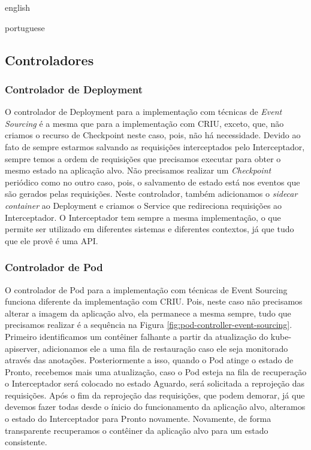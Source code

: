 \begin{otherlanguage*}{english}
\begin{otherlanguage*}{portuguese}
\subsection{Controladores}

\subsubsection{Controlador de Deployment}

O controlador de Deployment para a implementação com técnicas de \textit{Event Sourcing} é
a mesma que para a implementação com CRIU, exceto, que, não criamos o recurso de Checkpoint neste
caso, pois, não há necessidade. Devido ao fato de sempre estarmos salvando as requisições
interceptados pelo Interceptador, sempre temos a ordem de requisições que precisamos
executar para obter o mesmo estado na aplicação alvo. Não precisamos realizar um
\textit{Checkpoint} periódico como no outro caso, pois, o salvamento de estado está nos
eventos que são gerados pelas requisições. Neste controlador, também adicionamos o 
\textit{sidecar container} ao Deployment e criamos o Service que redireciona requisições
ao Interceptador. O Interceptador tem sempre a mesma implementação, o que permite ser
utilizado em diferentes sistemas e diferentes contextos, já que tudo que ele provê é uma
API.

\subsubsection{Controlador de Pod}

O controlador de Pod para a implementação com técnicas de Event Sourcing funciona
diferente da implementação com CRIU. Pois, neste caso não precisamos alterar a imagem da
aplicação alvo, ela permanece a mesma sempre, tudo que precisamos realizar é a sequência
na Figura \ref{fig:pod-controller-event-sourcing}. Primeiro identificamos um contêiner
falhante a partir da atualização do kube-apiserver, adicionamos ele a uma fila de
restauração caso ele seja monitorado através das anotações. Posteriormente a isso, quando
o Pod atinge o estado de Pronto, recebemos mais uma atualização, caso o Pod esteja na
fila de recuperação o Interceptador será colocado no estado Aguardo, será solicitada a
reprojeção das requisições. Após o fim da reprojeção das requisições, que podem demorar,
já que devemos fazer todas desde o ínicio do funcionamento da aplicação alvo, alteramos
o estado do Interceptador para Pronto novamente. Novamente, de forma transparente
recuperamos o contêiner da aplicação alvo para um estado consistente.


\end{otherlanguage*}
\end{otherlanguage*}
